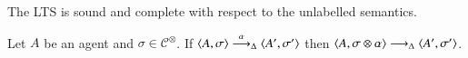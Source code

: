 \documentclass[main.tex]{subfiles}
\begin{document}
The LTS is sound and complete with respect to the unlabelled semantics. 


\begin{lemma}[Soundness]\label{lemma:soundness}
Let $A$ be an agent and $\sigma \in \mathcal{C}^\otimes$.
%
If $\langle A,\sigma \rangle \stackrel{\alpha}{\longrightarrow}_\Delta \langle A',\sigma' \rangle$ then $\langle A,\sigma \otimes \alpha \rangle \stackrel{}{\longrightarrow}_\Delta \langle A',\sigma' \rangle$.
\end{lemma}
\end{document}
